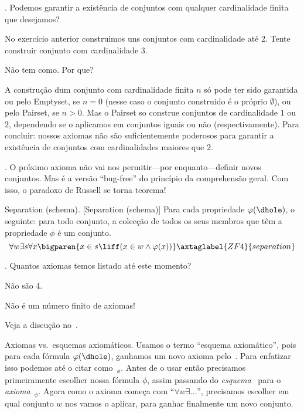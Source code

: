 {\endexercise

\exercise.
\label{only_sets_with_up_to_two_elements}%
Podemos garantir a existência de conjuntos com qualquer cardinalidade finita que desejamos?

\hint
No exercício anterior construimos uns conjuntos com cardinalidade até 2.
Tente construir conjunto com cardinalidade 3.

\hint
Não tem como.  Por que?

\solution
A construção dum conjunto com cardinalidade finita $n$ só pode ter sido garantida
ou pelo Emptyset, se $n=0$ (nesse caso o conjunto construido é o próprio $\emptyset$),
ou pelo Pairset, se $n>0$.  Mas o Pairset so construe
conjuntos de cardinalidade $1$ ou $2$, dependendo se o aplicamos em conjuntos
iguais ou não (respectivamente).
Para concluir: nossos axiomas não são suficientemente poderosos para garantir
a existência de conjuntos com cardinalidades maiores que $2$.

\endexercise

\note.
O próximo axioma não vai nos permitir---por enquanto---definir novos conjuntos.
Mas é a versão ``bug-free'' do princípio da comprehensão geral.
Com isso, o paradoxo de Russell se torna teorema!

\axiom Separation (schema).
[Separation (schema)]%
\label{separation}%
{\rm Para cada propriedade $\phi(\dhole)$, o seguinte:}
para todo conjunto, a colecção de todos os seus membros que têm a propriedade $\phi$ é um conjunto.
$$
\forall w
\exists s
\forall x
\bigparen{
x\in s
\liff
\paren{
x\in w 
\land
\phi(x)
}
}
\axtaglabel{ZF4}{separation}
$$

\exercise.
Quantos axiomas temos listado até este momento?

\hint
Não são 4.

\hint
Não é um número finito de axiomas!

\solution
Veja a discução no~.

\endexercise

\note Axiomas vs{.}~esquemas axiomáticos.
\label{axioms_vs_axiomatic_schemata}%
Usamos o termo ``esquema axiomático'', pois para cada fórmula $\phi(\dhole)$,
ganhamos um novo axioma pelo~.
Para enfatizar isso podemos até o citar como~$_{\phi}$.
Antes de o usar então precisamos primeiramente escolher nossa fórmula $\phi$, assim passando do \emph{esquema}~
para o \emph{axioma}~$_{\phi}$.
Agora como o axioma começa com ``$\forall w \exists \dots$'',
precisamos escolher em qual conjunto $w$ nos vamos o aplicar,
para ganhar finalmente um novo conjunto.

}
